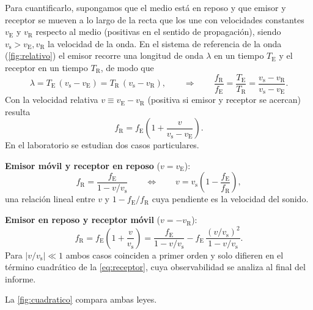 \documentclass[a4paper,11pt]{amsart}
\numberwithin{equation}{section}
\newcommand{\vs}{v_{\mathrm{s}}}              %
\newcommand{\vE}{v_{\mathrm{E}}}              %
\newcommand{\vR}{v_{\mathrm{R}}}              %
\newcommand{\fE}{f_{\mathrm{E}}}              %
\newcommand{\fR}{f_{\mathrm{R}}}              %
\newcommand{\TE}{T_{\mathrm{E}}}
\newcommand{\TR}{T_{\mathrm{R}}}
\theoremstyle{cienplano}
\theoremstyle{ciendef}
\theoremstyle{cienobs}
\newcounter{referencia}
\begin{document}
Para cuantificarlo, supongamos que el medio está en reposo y que emisor y
receptor se mueven a lo largo de la recta que los une con velocidades
constantes $\vE$ y $\vR$ respecto al medio (positivas en el sentido de
propagación), siendo $\vs>\vE,\vR$ la velocidad de la onda. En el sistema de
referencia de la onda (\cref{fig:relativo}) el emisor recorre una longitud de
onda $\lambda$ en un tiempo $\TE$ y el receptor en un tiempo $\TR$, de modo que
\begin{equation}\label{eq:lambda}
  \lambda=\TE\,(\vs-\vE)=\TR\,(\vs-\vR),
  \qquad\Longrightarrow\qquad
  \frac{\fR}{\fE}=\frac{\TE}{\TR}=\frac{\vs-\vR}{\vs-\vE}.
\end{equation}
Con la velocidad relativa $v\equiv\vE-\vR$ (positiva si emisor y receptor se
acercan) resulta
\begin{equation}\label{eq:doppler}
  \fR=\fE\left(1+\frac{v}{\vs-\vE}\right).
\end{equation}
En el laboratorio se estudian dos casos particulares.

\textbf{Emisor móvil y receptor en reposo} ($v=\vE$):
\begin{equation}\label{eq:emisor}
  \fR=\frac{\fE}{1-v/\vs}
  \qquad\Longleftrightarrow\qquad
  v=\vs\left(1-\frac{\fE}{\fR}\right),
\end{equation}
una relación lineal entre $v$ y $1-\fE/\fR$ cuya pendiente es la velocidad del
sonido.

\textbf{Emisor en reposo y receptor móvil} ($v=-\vR$):
\begin{equation}\label{eq:receptor}
  \fR=\fE\left(1+\frac{v}{\vs}\right)
  =\frac{\fE}{1-v/\vs}-\fE\,\frac{(v/\vs)^{2}}{1-v/\vs}.
\end{equation}
Para $|v/\vs|\ll1$ ambos casos coinciden a primer orden y solo difieren en el
término cuadrático de la \cref{eq:receptor}, cuya observabilidad se analiza al
final del informe.

La \cref{fig:cuadratico} compara ambas leyes.
\end{document}
